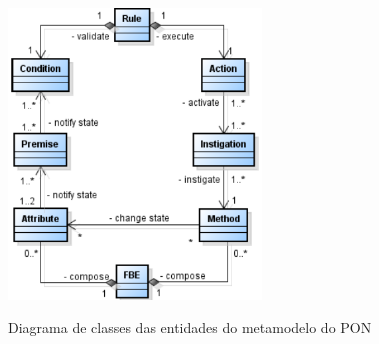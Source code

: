 \begin{figure}[!htb]
  \centering
  \caption{Diagrama de classes das entidades do metamodelo do PON}
  \includegraphics[width=0.6\textwidth]{../figures/metamodelo_pon.png}
  \label{fig:nop_class}
\end{figure}

